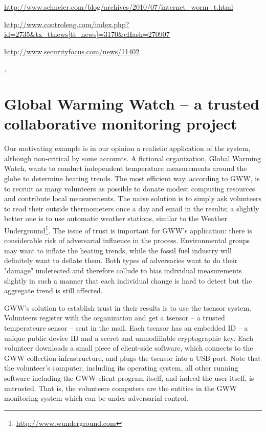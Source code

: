 \url{http://www.schneier.com/blog/archives/2010/07/internet_worm_t.html}

\url{http://www.controleng.com/index.php?id=2735&tx_ttnews[tt_news]=3170&cHash=270907}

\url{http://www.securityfocus.com/news/11402}

\cite{cardenas2008}, \cite{cardenas2009}


\section{Global Warming Watch -- a trusted collaborative monitoring project}

Our motivating example is in our opinion a realistic application of the system, although non-critical by some accounts. A fictional organization, Global Warming Watch, wants to conduct independent temperature measurements around the globe to determine heating trends. The most efficient way, according to GWW, is to recruit as many volunteers as possible to donate modest computing resources and contribute local measurements. The naive solution is to simply ask volunteers to read their outside thermometers once a day and email in the results; a slightly better one is to use automatic weather stations, similar to the Weather Underground\footnote{\url{http://www.wunderground.com}}. The issue of trust is important for GWW's application: there is considerable risk of adversarial influence in the process. Environmental groups may want to inflate the heating trends, while the fossil fuel industry will definitely want to deflate them. Both types of adversaries want to do their "damage" undetected and therefore collude to bias individual measurements slightly in such a manner that each individual change is hard to detect but the aggregate trend is still affected.

GWW's solution to establish trust in their results is to use the tsensor system. Volunteers register with the organization and get a tsensor -- a trusted temperateure sensor -- sent in the mail. Each tsensor has an embedded ID -- a unique public device ID and a secret and unmodifiable cryptographic key. Each volunteer downloads a small piece of client-side software, which connects to the GWW collection infrastructure, and plugs the tsensor into a USB port. Note that the volunteer's computer, including its operating system, all other running software including the GWW client program itself, and indeed the user itself, is untrusted. That is, the volunteers computers are the entities in the GWW monitoring system which can be under adversarial control.


